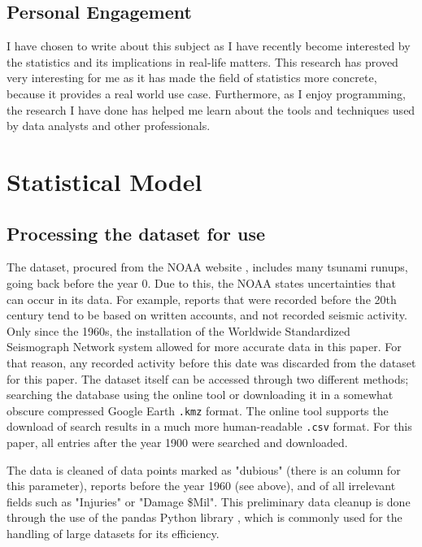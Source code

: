 \documentclass[11pt,letterpaper]{article}
\begin{document}
\subsection{Personal Engagement}

I have chosen to write about this subject as I have recently become interested by the
statistics and its implications in real-life matters. This research has proved very
interesting for me as it has made the field of statistics more concrete, because it provides 
a real world use case. Furthermore, as I enjoy programming, the research I have done 
has helped me learn about the tools and techniques used by data analysts and other professionals.

\section{Statistical Model}

\subsection{Processing the dataset for use}
The dataset, procured from the NOAA website \cite{noaa}, includes many tsunami
runups, going back before the year 0. Due to this, the NOAA states uncertainties
that can occur in its data. For example, reports that were recorded before the
20th century tend to be based on written accounts, and not recorded seismic activity.
Only since the 1960s, the installation of the Worldwide Standardized Seismograph
Network system allowed for more accurate data in this paper. For that reason, any recorded
activity before this date was discarded from the dataset for this paper. The dataset itself can
be accessed through two different methods; searching the database using the online
tool or downloading it in a somewhat obscure compressed Google Earth \verb|.kmz| format. 
The online tool supports the download of search results in a much more human-readable 
\verb|.csv| format. For this paper, all entries after the year 1900 were searched and downloaded.

The data is cleaned of data points marked as "dubious" (there is an column for this parameter), 
reports before the year 1960 (see above), and of all irrelevant fields such as "Injuries" 
or "Damage \$Mil". This preliminary data cleanup
is done through the use of the pandas Python library \cite{reback2020pandas}\cite{mckinney-proc-scipy-2010}, 
which is commonly used for the handling of large datasets for its efficiency. 
\end{document}

